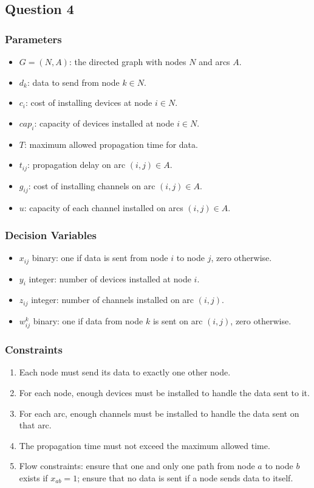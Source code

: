 \subsection*{Question 4}

\subsubsection*{Parameters}

\begin{itemize}
	\item $G = (N, A)$: the directed graph with nodes $N$ and arcs $A$.
	\item $d_k$: data to send from node $k \in N$.
	\item $c_i$: cost of installing devices at node $i \in N$.
	\item $cap_i$: capacity of devices installed at node $i \in N$.
	\item $T$: maximum allowed propagation time for data.
	\item $t_{ij}$: propagation delay on arc $(i, j) \in A$.
	\item $g_{ij}$: cost of installing channels on arc $(i, j) \in A$.
	\item $u$: capacity of each channel installed on arcs $(i, j) \in A$.
\end{itemize}

\subsubsection*{Decision Variables}

\begin{itemize}
	\item $x_{ij}$ binary: one if data is sent from node $i$ to node $j$, zero otherwise.
	\item $y_i$ integer: number of devices installed at node $i$.
	\item $z_{ij}$ integer: number of channels installed on arc $(i, j)$.
	\item $w_{ij}^k$ binary: one if data from node $k$ is sent on arc $(i, j)$, zero otherwise.
\end{itemize}

\subsubsection*{Constraints}

\begin{enumerate}
	\item Each node must send its data to exactly one other node.
	\item For each node, enough devices must be installed to handle the data sent to it.
	\item For each arc, enough channels must be installed to handle the data sent on that arc.
	\item The propagation time must not exceed the maximum allowed time.
	\item Flow constraints: ensure that one and only one path from node $a$ to node $b$ exists if $x_{ab} = 1$; ensure that no data is sent if a node sends data to itself.
\end{enumerate}

